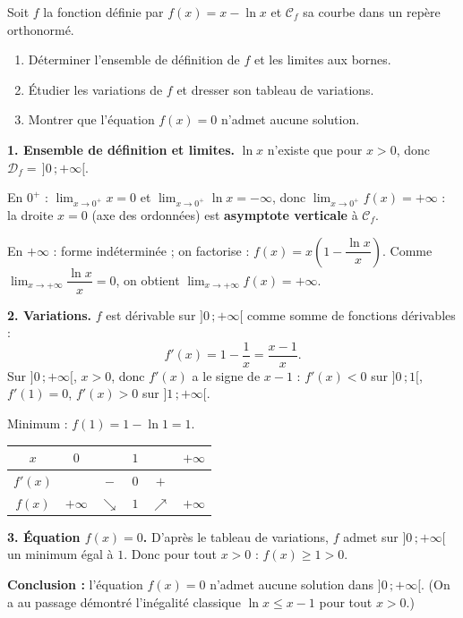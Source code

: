 \documentclass[11pt]{article}
\begin{document}
\begin{exoresolu}[Étude de $f(x)=x-\ln x$ (type Bac)]
Soit $f$ la fonction définie par $f(x)=x-\ln x$ et $\mathcal{C}_f$ sa courbe dans un repère orthonormé.
\begin{enumerate}
\item Déterminer l'ensemble de définition de $f$ et les limites aux bornes.
\item Étudier les variations de $f$ et dresser son tableau de variations.
\item Montrer que l'équation $f(x)=0$ n'admet aucune solution.
\end{enumerate}
\tcblower
\textbf{1. Ensemble de définition et limites.} $\ln x$ n'existe que pour $x>0$, donc $\mathcal{D}_f=\,]0\,;+\infty[$.

En $0^+$ : $\displaystyle\lim_{x\to 0^+}x=0$ et $\displaystyle\lim_{x\to 0^+}\ln x=-\infty$, donc $\displaystyle\lim_{x\to 0^+}f(x)=+\infty$ : la droite $x=0$ (axe des ordonnées) est \textbf{asymptote verticale} à $\mathcal{C}_f$.

En $+\infty$ : forme indéterminée ; on factorise : $f(x)=x\left(1-\dfrac{\ln x}{x}\right)$. Comme $\displaystyle\lim_{x\to+\infty}\dfrac{\ln x}{x}=0$, on obtient $\displaystyle\lim_{x\to+\infty}f(x)=+\infty$.

\textbf{2. Variations.} $f$ est dérivable sur $]0\,;+\infty[$ comme somme de fonctions dérivables :
\[ f'(x)=1-\frac{1}{x}=\frac{x-1}{x}. \]
Sur $]0\,;+\infty[$, $x>0$, donc $f'(x)$ a le signe de $x-1$ : $f'(x)<0$ sur $]0\,;1[$, $f'(1)=0$, $f'(x)>0$ sur $]1\,;+\infty[$.

Minimum : $f(1)=1-\ln 1=1$.

\begin{center}
\begin{tabular}{|c|ccccc|}
\hline
$x$ & $0$ & & $1$ & & $+\infty$ \\
\hline
$f'(x)$ & & $-$ & $0$ & $+$ & \\
\hline
$f(x)$ & $+\infty$ & $\searrow$ & $1$ & $\nearrow$ & $+\infty$ \\
\hline
\end{tabular}
\end{center}

\textbf{3. Équation $f(x)=0$.} D'après le tableau de variations, $f$ admet sur $]0\,;+\infty[$ un minimum égal à $1$. Donc pour tout $x>0$ : $f(x)\geqslant 1>0$.

\textbf{Conclusion :} l'équation $f(x)=0$ n'admet aucune solution dans $]0\,;+\infty[$. (On a au passage démontré l'inégalité classique $\ln x\leqslant x-1$ pour tout $x>0$.)
\end{exoresolu}
\end{document}
